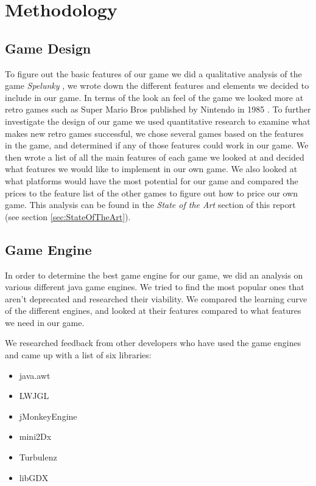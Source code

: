 \documentclass[12p]{article}
\begin{document}
\newpage
\section{Methodology} \label{Methodology}

\subsection{Game Design}

To figure out the basic features of our game we did a qualitative analysis of the game \emph{Spelunky} \cite{Spelunky}, we wrote down the different features and elements we decided to include in our game. In terms of the look an feel of the game we looked more at retro games such as Super Mario Bros published by Nintendo in 1985 \cite{SuperMarioBros}. To further investigate the design of our game we used quantitative research to examine what makes new retro games successful, we chose several games based on the features in the game, and determined if any of those features could work in our game. We then wrote a list of all the main features of each game we looked at and decided what features we would like to implement in our own game. We also looked at what platforms would have the most potential for our game and compared the prices to the feature list of the other games to figure out how to price our own game. This analysis can be found in the \emph{State of the Art} section of this report (see section \ref{sec:StateOfTheArt}).

\subsection{Game Engine}

In order to determine the best game engine for our game, we did an analysis on various different java game engines. We tried to find the most popular ones that aren't deprecated and researched their viability. We compared the learning curve of the different engines, and looked at their features compared to what features we need in our game.

We researched feedback from other developers who have used the game engines and came up with a list of six libraries:

\begin{itemize}
  \item java.awt \cite{javaawt}
  \item LWJGL \cite{LWJGL}
  \item jMonkeyEngine \cite{jMonkeyEngine}
  \item mini2Dx \cite{mini2Dx}
  \item Turbulenz \cite{Turbulenz}
  \item libGDX \cite{libGDX}
\end{itemize}
\end{document}
